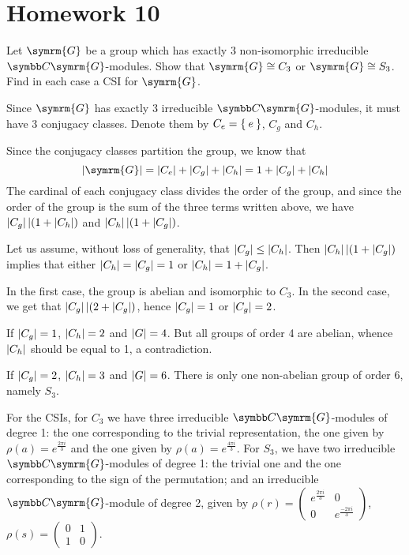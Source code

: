 \section*{Homework 10}

\begin{exercise}
Let \(\symrm{G}\) be a group which has exactly 3 non-isomorphic irreducible \(\complex \symrm{G}\)-modules. Show that \(\symrm{G} \cong C_3\) or \(\symrm{G} \cong S_3\). Find in each case a CSI for \(\symrm{G}\).
\end{exercise}
\begin{solution}
Since \(\symrm{G}\) has exactly 3 irreducible \(\complex \symrm{G}\)-modules, it must have 3 conjugacy classes. Denote them by \(C_e = \Set{e}\), \(C_g\) and \(C_h\).

Since the conjugacy classes partition the group, we know that
\[
    \abs{\symrm{G}} = \abs{C_e} + \abs{C_g} + \abs{C_h} = 1 + \abs{C_g} + \abs{C_h}
\]
The cardinal of each conjugacy class divides the order of the group, and since the order of the group is the sum of the three terms written above, we have \(\left|C_g\right| \operatorname*{\mid} (1 + \left|C_h\right|)\) and \(\left|C_h\right| \operatorname*{\mid} (1 + \left|C_g\right|)\).

Let us assume, without loss of generality, that \(\left|C_g\right| \leq \left|C_h\right|\). Then \(\left|C_h\right| \operatorname*{\mid} (1 + \left|C_g\right|)\) implies that either \(\left|C_h\right| = \left|C_g\right| = 1\) or \(\left|C_h\right| = 1 + \left|C_g\right|\).

In the first case, the group is abelian and isomorphic to \(C_3\). In the second case, we get that \(\left|C_g\right| \operatorname*{\mid} (2 + \left|C_g\right|)\), hence \(\left|C_g\right| = 1\) or \(\left|C_g\right| = 2\).

If \(\left|C_g\right| = 1\), \(\left|C_h\right| = 2\) and \(\left|G\right| = 4\). But all groups of order 4 are abelian, whence \(\left|C_h\right|\) should be equal to 1, a contradiction.

If \(\left|C_g\right| = 2\), \(\left|C_h\right| = 3\) and \(\left|G\right| = 6\). There is only one non-abelian group of order 6, namely \(S_3\).

For the CSIs, for \(C_3\) we have three irreducible \(\complex \symrm{G}\)-modules of degree 1: the one corresponding to the trivial representation, the one given by \(\rho(a) = e^{\frac{2 \pi i}{3}}\) and the one given by \(\rho(a) = e^{\frac{4 \pi i}{3}}\). For \(S_3\), we have two irreducible \(\complex \symrm{G}\)-modules of degree 1: the trivial one and the one corresponding to the sign of the permutation; and an irreducible \(\complex \symrm{G}\)-module of degree 2, given by \(\rho(r) = \begin{pmatrix} e^{\frac{2 \pi i}{3}} & 0 \\ 0 & e^{\frac{-2 \pi i}{3}} \end{pmatrix}\), \(\rho(s) = \begin{pmatrix} 0 & 1 \\ 1 & 0 \end{pmatrix}\).
\end{solution}

